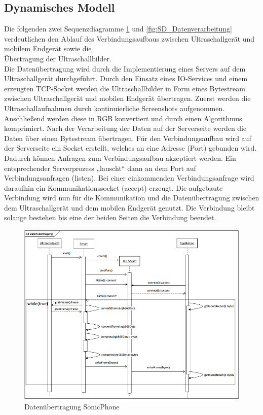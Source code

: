 \subsection{Dynamisches Modell}
Die folgenden zwei Sequenzdiagramme \ref{fig:SD_Datenuebertragung} und \ref{fig:SD_Datenverarbeitung}  verdeutlichen den Ablauf des Verbindungsaufbaus zwischen Ultraschallgerät und mobilem Endgerät sowie die \\ Übertragung der Ultraschallbilder.\\
Die Datenübertragung wird durch die Implementierung eines Servers auf dem Ultraschallgerät durchgeführt. Durch den Einsatz eines IO-Services und einem erzeugten TCP-Socket werden die Ultraschallbilder in Form eines Bytestream zwischen Ultraschallgerät und mobilen Endgerät übertragen. Zuerst werden die Ultraschallaufnahmen durch kontinuierliche Screenshots aufgenommen. Anschließend werden diese in RGB konvertiert und durch einen Algorithmus komprimiert. Nach der Verarbeitung der Daten auf der Serverseite werden die Daten über einen Bytestream übertragen. Für den Verbindungsaufbau wird auf der Serverseite ein Socket erstellt, welches an eine Adresse (Port) gebunden wird. Dadurch können Anfragen zum Verbindungsaufbau akzeptiert werden. Ein entsprechender Serverprozess „lauscht“ dann an dem Port auf Verbindungsanfragen (listen). Bei einer einkommenden Verbindungsanfrage wird daraufhin ein Kommunikationssocket (accept) erzeugt. Die aufgebaute Verbindung wird nun für die Kommunikation und die Datenübertragung zwischen dem Ultraschallgerät und dem mobilen Endgerät genutzt. Die Verbindung bleibt solange bestehen bis eine der beiden Seiten die Verbindung beendet. 

\begin{figure}[H] 
\centering
\includegraphics[width=1\textwidth]{Bilder/objektorientierteAnalyseundEntwurf/SD_Datenuebertragung}
\caption{{\small Datenübertragung SonicPhone}}
\label{fig:SD_Datenuebertragung}
\end{figure}

